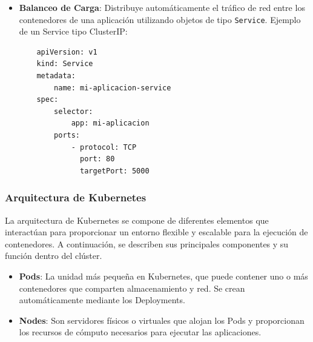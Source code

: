{\begin{itemize}
                    \begin{verbatim}
    apiVersion: apps/v1
    kind: Deployment
    metadata:
        name: mi-aplicacion
    spec:
        replicas: 3
        selector:
            matchLabels:
                app: mi-aplicacion
        template:
            metadata:
                labels:
                    app: mi-aplicacion
            spec:
                containers:
                - name: mi-aplicacion
                  image: usuario/mi-aplicacion:1.0
                  ports:
                  - containerPort: 5000
                    \end{verbatim}
                
                    \item \textbf{Balanceo de Carga}: Distribuye automáticamente el tráfico de red entre los contenedores de una aplicación utilizando objetos de tipo \texttt{Service}. Ejemplo de un Service tipo ClusterIP:
                
                    \begin{verbatim}
    apiVersion: v1
    kind: Service
    metadata:
        name: mi-aplicacion-service
    spec:
        selector:
            app: mi-aplicacion
        ports:
            - protocol: TCP
              port: 80
              targetPort: 5000
                    \end{verbatim}
                \end{itemize}
            
            \subsubsection{Arquitectura de Kubernetes}
                La arquitectura de Kubernetes se compone de diferentes elementos que interactúan para proporcionar un entorno flexible y escalable para la ejecución de contenedores. A continuación, se describen sus principales componentes y su función dentro del clúster.

                \begin{itemize}
                    \item \textbf{Pods}: La unidad más pequeña en Kubernetes, que puede contener uno o más contenedores que comparten almacenamiento y red. Se crean automáticamente mediante los Deployments.
                
                    \item \textbf{Nodes}: Son servidores físicos o virtuales que alojan los Pods y proporcionan los recursos de cómputo necesarios para ejecutar las aplicaciones.
                

\end{itemize}}
